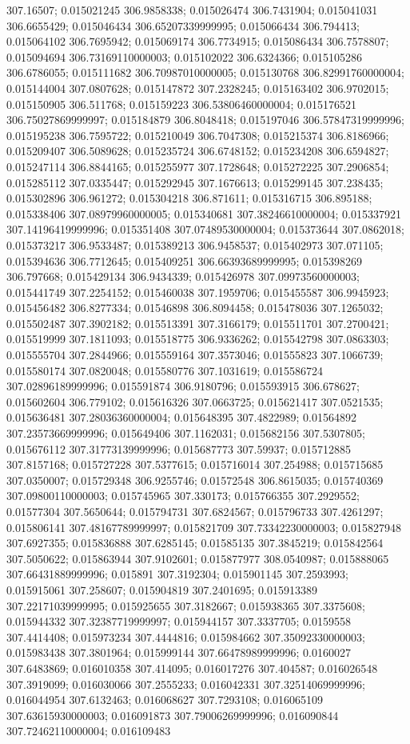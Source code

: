 307.16507; 0.015021245 306.9858338; 0.015026474 306.7431904; 0.015041031 306.6655429; 0.015046434 306.65207339999995; 0.015066434 306.794413; 0.015064102 306.7695942; 0.015069174 306.7734915; 0.015086434 306.7578807; 0.015094694 306.73169110000003; 0.015102022 306.6324366; 0.015105286 306.6786055; 0.015111682 306.70987010000005; 0.015130768 306.82991760000004; 0.015144004 307.0807628; 0.015147872 307.2328245; 0.015163402 306.9702015; 0.015150905 306.511768; 0.015159223 306.53806460000004; 0.015176521 306.75027869999997; 0.015184879 306.8048418; 0.015197046 306.57847319999996; 0.015195238 306.7595722; 0.015210049 306.7047308; 0.015215374 306.8186966; 0.015209407 306.5089628; 0.015235724 306.6748152; 0.015234208 306.6594827; 0.015247114 306.8844165; 0.015255977 307.1728648; 0.015272225 307.2906854; 0.015285112 307.0335447; 0.015292945 307.1676613; 0.015299145 307.238435; 0.015302896 306.961272; 0.015304218 306.871611; 0.015316715 306.895188; 0.015338406 307.08979960000005; 0.015340681 307.38246610000004; 0.015337921 307.14196419999996; 0.015351408 307.07489530000004; 0.015373644 307.0862018; 0.015373217 306.9533487; 0.015389213 306.9458537; 0.015402973 307.071105; 0.015394636 306.7712645; 0.015409251 306.66393689999995; 0.015398269 306.797668; 0.015429134 306.9434339; 0.015426978 307.09973560000003; 0.015441749 307.2254152; 0.015460038 307.1959706; 0.015455587 306.9945923; 0.015456482 306.8277334; 0.01546898 306.8094458; 0.015478036 307.1265032; 0.015502487 307.3902182; 0.015513391 307.3166179; 0.015511701 307.2700421; 0.015519999 307.1811093; 0.015518775 306.9336262; 0.015542798 307.0863303; 0.015555704 307.2844966; 0.015559164 307.3573046; 0.01555823 307.1066739; 0.015580174 307.0820048; 0.015580776 307.1031619; 0.015586724 307.02896189999996; 0.015591874 306.9180796; 0.015593915 306.678627; 0.015602604 306.779102; 0.015616326 307.0663725; 0.015621417 307.0521535; 0.015636481 307.28036360000004; 0.015648395 307.4822989; 0.01564892 307.23573669999996; 0.015649406 307.1162031; 0.015682156 307.5307805; 0.015676112 307.31773139999996; 0.015687773 307.59937; 0.015712885 307.8157168; 0.015727228 307.5377615; 0.015716014 307.254988; 0.015715685 307.0350007; 0.015729348 306.9255746; 0.01572548 306.8615035; 0.015740369 307.09800110000003; 0.015745965 307.330173; 0.015766355 307.2929552; 0.01577304 307.5650644; 0.015794731 307.6824567; 0.015796733 307.4261297; 0.015806141 307.48167789999997; 0.015821709 307.73342230000003; 0.015827948 307.6927355; 0.015836888 307.6285145; 0.01585135 307.3845219; 0.015842564 307.5050622; 0.015863944 307.9102601; 0.015877977 308.0540987; 0.015888065 307.66431889999996; 0.015891 307.3192304; 0.015901145 307.2593993; 0.015915061 307.258607; 0.015904819 307.2401695; 0.015913389 307.22171039999995; 0.015925655 307.3182667; 0.015938365 307.3375608; 0.015944332 307.32387719999997; 0.015944157 307.3337705; 0.0159558 307.4414408; 0.015973234 307.4444816; 0.015984662 307.35092330000003; 0.015983438 307.3801964; 0.015999144 307.66478989999996; 0.0160027 307.6483869; 0.016010358 307.414095; 0.016017276 307.404587; 0.016026548 307.3919099; 0.016030066 307.2555233; 0.016042331 307.32514069999996; 0.016044954 307.6132463; 0.016068627 307.7293108; 0.016065109 307.63615930000003; 0.016091873 307.79006269999996; 0.016090844 307.72462110000004; 0.016109483 